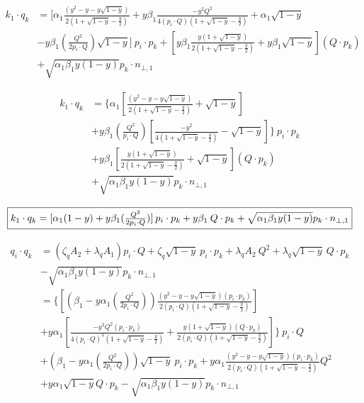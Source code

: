 \begin{equation}
	\begin{aligned}
	k_1 \cdot q_k &= [\alpha_1 \frac{(y^2 -y-y\sqrt{1-y}) }{2(1+\sqrt{1-y}-\frac{y}{2})}+y\beta_1\frac{-y^2 Q^2 }{4(p_i\cdot Q)(1+\sqrt{1-y}-\frac{y}{2})}+\alpha_1 \sqrt{1-y}\\&-y\beta_1(\frac{Q^2}{2p_i \cdot Q})\sqrt{1-y}]\:p_i \cdot p_k+[y\beta_1\frac{y(1+\sqrt{1-y})}{2(1+\sqrt{1-y}-\frac{y}{2})}+y\beta_1\sqrt{1-y}](Q\cdot p_k)\\
	&+\sqrt{\alpha_1\beta_1y(1-y)} p_k \cdot {n_{\bot,1}} 
    \end{aligned}
\end{equation}

\begin{equation}
	\begin{aligned}
	k_1 \cdot q_k &= \lbrace\alpha_1 [\frac{(y^2 -y-y\sqrt{1-y}) }{2(1+\sqrt{1-y}-\frac{y}{2})}+ \sqrt{1-y}]\\
	&+y\beta_1(\frac{Q^2}{p_i \cdot Q})[\frac{-y^2 }{4(1+\sqrt{1-y}-\frac{y}{2})}-\sqrt{1-y}]\rbrace\:p_i \cdot p_k\\
	&+y\beta_1[\frac{y(1+\sqrt{1-y})}{2(1+\sqrt{1-y}-\frac{y}{2})}+\sqrt{1-y}](Q\cdot p_k)\\
	&+\sqrt{\alpha_1\beta_1y(1-y)} p_k \cdot {n_{\bot,1}} 
    \end{aligned}
\end{equation}

\begin{equation}
	\begin{aligned}
		\fbox{$  k_1 \cdot q_k = [\alpha_1 (1-y)+y\beta_1(\frac{Q^2}{2p_i \cdot Q})]\:p_i \cdot p_k+y\beta_1\:Q\cdot p_k+\sqrt{\alpha_1\beta_1y(1-y)} p_k \cdot {n_{\bot,1}} $}
    \end{aligned}
\end{equation}

\begin{equation}
	\begin{aligned}	
	q_i \cdot q_k &= (\zeta_q A_2 + \lambda_q A_1)p_i \cdot Q+\zeta_q \sqrt{1-y}\:p_i\cdot p_k + \lambda_q A_2\:Q^2+ \lambda_q\sqrt{1-y}\:Q\cdot p_k\\
	&-\sqrt{\alpha_1\beta_1y(1-y)} p_k \cdot {n_{\bot,1}}\\	
	&=\lbrace[(\beta_1 -y\alpha_1(\frac{Q^2}{2p_i \cdot Q}))\frac{(y^2 -y-y\sqrt{1-y}) (p_{i}\cdot {p_k})}{2(p_i\cdot Q)(1+\sqrt{1-y}-\frac{y}{2})}]\\&
	+y\alpha_1[\frac{-y^2 Q^2 (p_{i}\cdot {p_k})}{4(p_i\cdot Q)^2(1+\sqrt{1-y}-\frac{y}{2})}+ \frac{y(1+\sqrt{1-y})(Q \cdot {p_k})}{2(p_i\cdot Q)(1+\sqrt{1-y}-\frac{y}{2})}]\rbrace\:p_i \cdot Q\\
	&+(\beta_1 -y\alpha_1(\frac{Q^2}{2p_i \cdot Q}))\sqrt{1-y}\:p_i \cdot p_k+y\alpha_1\frac{(y^2 -y-y\sqrt{1-y}) (p_{i}\cdot {p_k})}{2(p_i\cdot Q)(1+\sqrt{1-y}-\frac{y}{2})}Q^2\\
	&+y\alpha_1\sqrt{1-y} Q\cdot p_k-\sqrt{\alpha_1\beta_1y(1-y)} p_k \cdot {n_{\bot,1}} 
    \end{aligned}
\end{equation}


